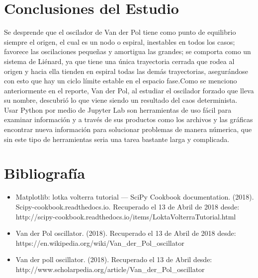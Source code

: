 \documentclass[12pt]{article}
\begin{document}
\section*{Conclusiones del Estudio}
Se desprende que el oscilador de Van der Pol tiene como punto de equilibrio siempre el origen, el cual es un nodo o espiral,
inestables en todos los casos; favorece las oscilaciones
pequeñas y amortigua las grandes; se comporta como un sistema de Liénard, ya que tiene una única trayectoria cerrada que rodea al origen y hacia ella tienden en espiral todas las demás
trayectorias, asegurándose con esto que hay un ciclo límite estable en el espacio fase.Como se menciono anteriormente en el reporte, Van der Pol, al estudiar el oscilador forzado que lleva su nombre, descubrió lo que viene siendo un resultado del caos determinista. \\

Usar Python por medio de Jupyter Lab son herramientas de uso fácil para examinar información y a través de sus productos como los archivos y las gráficas encontrar nueva información para solucionar problemas de manera númerica, que sin este tipo de herramientas seria una tarea bastante larga y complicada.

\section*{Bibliografía}
\begin{itemize}
\item Matplotlib: lotka volterra tutorial — SciPy Cookbook documentation. (2018). Scipy-cookbook.readthedocs.io. 
Recuperado el 13 de Abril de 2018 desde:\\
http://scipy-cookbook.readthedocs.io/items/LoktaVolterraTutorial.html

\item Van der Pol oscillator. (2018). Recuperado el 13 de Abril de 2018 desde:\\ https://en.wikipedia.org/wiki/Van\_der\_Pol\_oscillator

\item Van der poll oscillator. (2018). Recuperado el 13 de Abril desde: \\
http://www.scholarpedia.org/article/Van\_der\_Pol\_oscillator
\end{itemize}
\end{document}
